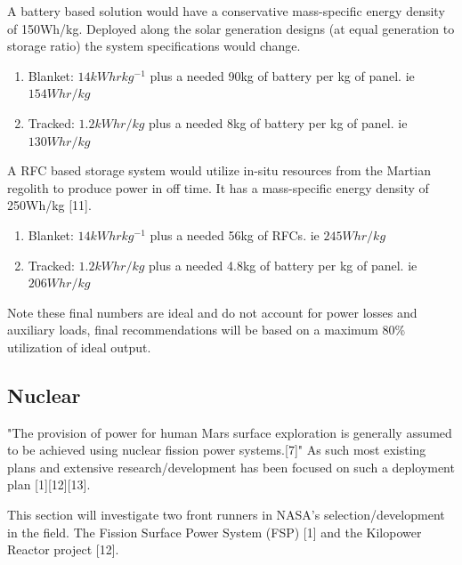\documentclass[12pt]{IEEEtran}
\begin{document}
A battery based solution would have a conservative mass-specific energy density of 150Wh/kg. Deployed along the solar generation designs (at equal generation to storage ratio) the system specifications would change.
\begin{enumerate}
	\item Blanket: $14kWhr kg^{-1}$ plus a needed 90kg of battery per kg of panel. ie $154Whr/kg$
	\item Tracked: $1.2 kWhr/kg$ plus a needed 8kg of battery per kg of panel. ie $130Whr/kg$
\end{enumerate}

A RFC based storage system would utilize in-situ resources from the Martian regolith to produce power in off time. It has a mass-specific energy density of 250Wh/kg [11].

\begin{enumerate}
	\item Blanket: $14kWhr kg^{-1}$ plus a needed 56kg of RFCs. ie $245Whr/kg$
	\item Tracked: $1.2 kWhr/kg$ plus a needed 4.8kg of battery per kg of panel. ie $206Whr/kg$
\end{enumerate}

Note these final numbers are ideal and do not account for power losses and auxiliary loads, final recommendations will be based on a maximum 80\% utilization of ideal output.
\subsection*{Nuclear}
"The provision of power for human Mars surface exploration is generally assumed to be achieved using nuclear fission power systems.[7]" As such most existing plans and extensive research/development has been focused on such a deployment plan [1][12][13].

This section will investigate two front runners in NASA's selection/development in the field. The Fission Surface Power System (FSP) [1] and the Kilopower Reactor project [12].
\end{document}
